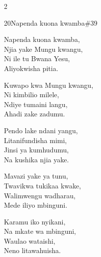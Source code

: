 \begin{multicols}{2}
\begin{hymn}{20}{Napenda kuona kwamba}{\#39}
\begin{stanza}
Napenda kuona kwamba,\\
Njia yake Mungu kwangu,\\
Ni ile tu Bwana Yesu,\\
Aliyokwisha pitia.
\end{stanza}
\begin{chorus}
Kuwapo kwa Mungu kwangu,\\
Ni kimbilio milele,\\
Ndiye tumaini langu,\\
Ahadi zake zadumu.
\end{chorus}
\begin{stanza}
Pendo lake ndani yangu,\\
Litanifundisha mimi,\\
Jinsi ya kumhudumu,\\
Na kushika njia yake.
\end{stanza}
\begin{stanza}
Mavazi yake ya tunu,\\
Twavikwa tukikaa kwake,\\
Walimwengu wadharau,\\
Mede iliyo mbinguni.
\end{stanza}
\begin{stanza}
Karamu iko nyikani,\\
Na mkate wa mbinguni,\\
Waulao wataishi,\\
Neno litawahuisha.
\end{stanza}
\end{hymn}


\end{multicols}
